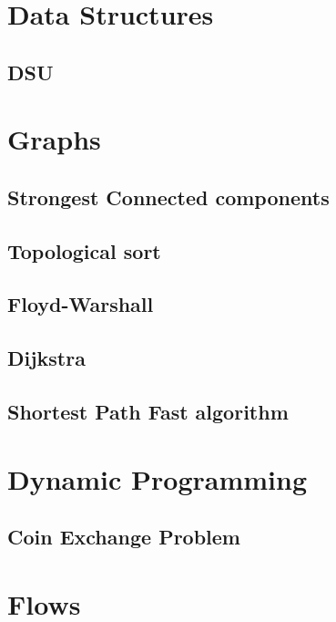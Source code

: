 \section{Data Structures}
\subsection{ DSU}
\raggedbottom
\hrulefill

\section{Graphs}
\subsection{Strongest Connected components}
\raggedbottom
\hrulefill
\subsection{Topological sort}
\raggedbottom
\hrulefill
\subsection{ Floyd-Warshall}
\raggedbottom
\hrulefill
\subsection{   Dijkstra}
\raggedbottom
\hrulefill
\subsection{   Shortest Path Fast algorithm}
\raggedbottom
\hrulefill

\section{Dynamic Programming}
\subsection{   Coin Exchange Problem}
\raggedbottom
\hrulefill

\section{Flows}
